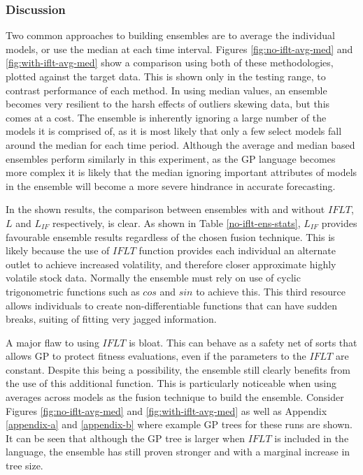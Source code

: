 \documentclass[12pt, letterpaper]{article}
\begin{document}
\subsubsection{Discussion}

\textrm{ \indent Two common approaches to building ensembles are to average the individual models, or use the median at each time interval. Figures \ref{fig:no-iflt-avg-med} and \ref{fig:with-iflt-avg-med} show a comparison using both of these methodologies, plotted against the target data. This is shown only in the testing range, to contrast performance of each method. In using median values, an ensemble becomes very resilient to the harsh effects of outliers skewing data, but this comes at a cost. The ensemble is inherently ignoring a large number of the models it is comprised of, as it is most likely that only a few select models fall around the median for each time period. Although the average and median based ensembles perform similarly in this experiment, as the GP language becomes more complex it is likely that the median ignoring important attributes of models in the ensemble will become a more severe hindrance in accurate forecasting. }

\textrm{ \indent In the shown results, the comparison between ensembles with and without $IFLT$, $L$ and $L_{IF}$ respectively, is clear. As shown in Table \ref{no-iflt-ens-stats}, $L_{IF}$ provides favourable ensemble results regardless of the chosen fusion technique. This is likely because the use of $IFLT$ function provides each individual an alternate outlet to achieve increased volatility, and therefore closer approximate highly volatile stock data. Normally the ensemble must rely on use of cyclic trigonometric functions such as $cos$ and $sin$ to achieve this. This third resource allows individuals to create non-differentiable functions that can have sudden breaks, suiting of fitting very jagged information. }

\textrm{ \indent A major flaw to using $IFLT$ is bloat. This can behave as a safety net of sorts that allows GP to protect fitness evaluations, even if the parameters to the $IFLT$ are constant. Despite this being a possibility, the ensemble still clearly benefits from the use of this additional function. This is particularly noticeable when using averages across models as the fusion technique to build the ensemble. Consider Figures \ref{fig:no-iflt-avg-med} and \ref{fig:with-iflt-avg-med} as well as Appendix \ref{appendix-a} and \ref{appendix-b} where example GP trees for these runs are shown. It can be seen that although the GP tree is larger when $IFLT$ is included in the language, the ensemble has still proven stronger and with a marginal increase in tree size. }
\end{document}
